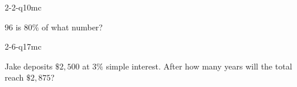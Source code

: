 \begin{practiceQuestion}{2-2-q10}{mc}
\begin{questionText}
$96$ is $80\%$ of what number?
\end{questionText}
\end{practiceQuestion}

\begin{practiceQuestion}{2-6-q17}{mc}
\begin{questionText}
Jake deposits $\$2{,}500$ at $3\%$ simple interest. After how many years will the total reach $\$2{,}875$?
\end{questionText}
\end{practiceQuestion}

